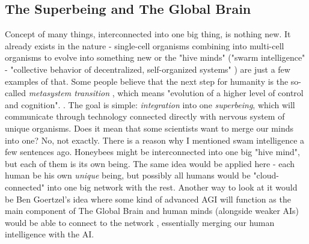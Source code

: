 \documentclass[12pt]{article}
\begin{document}
\subsection{The Superbeing and The Global Brain}
	Concept of many things, interconnected into one big thing, is nothing new. It already exists in the nature - single-cell organisms combining into multi-cell organisms to evolve into something new or the "hive minds" ("swarm intelligence" -  "collective behavior of decentralized, self-organized systems" \cite{wikipediaSwarm}) are just a few examples of that. Some people believe that the next step for humanity is the so-called \emph{metasystem transition} \cite{turchin:1}, which means "evolution of a higher level of control and cognition". \cite{heylighen:1}. The goal is simple: \emph{integration} into one \emph{superbeing}, which will communicate through technology connected directly with nervous system of unique organisms. Does it mean that some scientists want to merge our minds into one? No, not exactly. There is a reason why I mentioned swam intelligence a few sentences ago. Honeybees might be interconnected into one big "hive mind", but each of them is its own being. The same idea would be applied here - each human be his own \emph{unique} being, but possibly all humans would be "cloud-connected" into one big network with the rest. Another way to look at it would be Ben Goertzel's idea where some kind of advanced AGI will function as the main component of The Global Brain and human minds (alongside weaker AIs) would be able to connect to the network \cite{globalbrain:1}, essentially merging our human intelligence with the AI.
\end{document}
